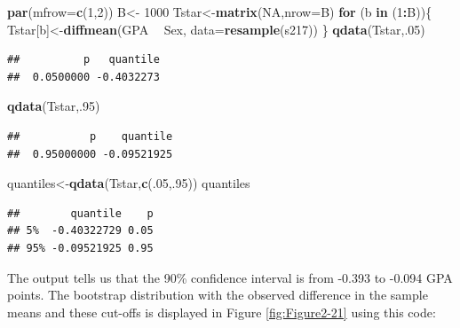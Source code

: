 \documentclass[]{book}
\newenvironment{Shaded}{\begin{snugshade}}{\end{snugshade}}
\newcommand{\KeywordTok}[1]{\textcolor[rgb]{0.13,0.29,0.53}{\textbf{#1}}}
\newcommand{\DataTypeTok}[1]{\textcolor[rgb]{0.13,0.29,0.53}{#1}}
\newcommand{\DecValTok}[1]{\textcolor[rgb]{0.00,0.00,0.81}{#1}}
\newcommand{\StringTok}[1]{\textcolor[rgb]{0.31,0.60,0.02}{#1}}
\newcommand{\OtherTok}[1]{\textcolor[rgb]{0.56,0.35,0.01}{#1}}
\newcommand{\ControlFlowTok}[1]{\textcolor[rgb]{0.13,0.29,0.53}{\textbf{#1}}}
\newcommand{\OperatorTok}[1]{\textcolor[rgb]{0.81,0.36,0.00}{\textbf{#1}}}
\newcommand{\NormalTok}[1]{#1}
\begin{document}
\begin{Shaded}
\begin{Highlighting}[]
\KeywordTok{par}\NormalTok{(}\DataTypeTok{mfrow=}\KeywordTok{c}\NormalTok{(}\DecValTok{1}\NormalTok{,}\DecValTok{2}\NormalTok{))}
\NormalTok{B<-}\StringTok{ }\DecValTok{1000}
\NormalTok{Tstar<-}\KeywordTok{matrix}\NormalTok{(}\OtherTok{NA}\NormalTok{,}\DataTypeTok{nrow=}\NormalTok{B)}
\ControlFlowTok{for}\NormalTok{ (b }\ControlFlowTok{in}\NormalTok{ (}\DecValTok{1}\OperatorTok{:}\NormalTok{B))\{}
\NormalTok{  Tstar[b]<-}\KeywordTok{diffmean}\NormalTok{(GPA }\OperatorTok{~}\StringTok{ }\NormalTok{Sex, }\DataTypeTok{data=}\KeywordTok{resample}\NormalTok{(s217))}
\NormalTok{  \}}
\KeywordTok{qdata}\NormalTok{(Tstar,.}\DecValTok{05}\NormalTok{)}
\end{Highlighting}
\end{Shaded}

\begin{verbatim}
##          p   quantile 
##  0.0500000 -0.4032273
\end{verbatim}

\begin{Shaded}
\begin{Highlighting}[]
\KeywordTok{qdata}\NormalTok{(Tstar,.}\DecValTok{95}\NormalTok{)}
\end{Highlighting}
\end{Shaded}

\begin{verbatim}
##           p    quantile 
##  0.95000000 -0.09521925
\end{verbatim}

\begin{Shaded}
\begin{Highlighting}[]
\NormalTok{quantiles<-}\KeywordTok{qdata}\NormalTok{(Tstar,}\KeywordTok{c}\NormalTok{(.}\DecValTok{05}\NormalTok{,.}\DecValTok{95}\NormalTok{))}
\NormalTok{quantiles}
\end{Highlighting}
\end{Shaded}

\begin{verbatim}
##        quantile    p
## 5%  -0.40322729 0.05
## 95% -0.09521925 0.95
\end{verbatim}

The output tells us that the 90\% confidence interval is from -0.393 to
-0.094 GPA points. The bootstrap distribution with the observed
difference in the sample means and these cut-offs is displayed in Figure
\ref{fig:Figure2-21} using this code:
\end{document}
